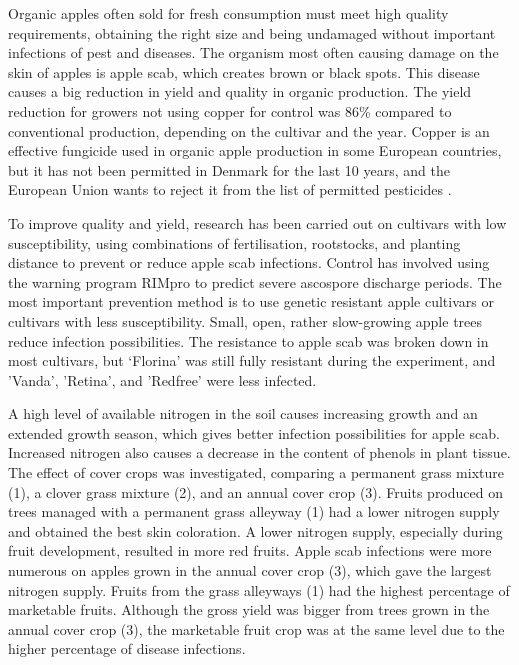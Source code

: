 Organic apples often sold for fresh consumption must meet high quality requirements, obtaining the right size and being undamaged without important infections of pest and diseases. The organism most often causing damage on the skin of apples is apple scab, which creates brown or black spots. This disease causes a big reduction in yield and quality in organic production. The yield reduction for growers not using copper for control was 86\% compared to conventional production, depending on the cultivar and the year. Copper is an effective fungicide used in organic apple production in some European countries, but it has not been permitted in Denmark for the last 10 years, and the European Union wants to reject it from the list of permitted pesticides \cite*{rm_10.1_L17-18_sustainable_production_organic_apple_production}.

\vspace{0.5em}
To improve quality and yield, research has been carried out on cultivars with low susceptibility, using combinations of fertilisation, rootstocks, and planting distance to prevent or reduce apple scab infections. Control has involved using the warning program RIMpro to predict severe ascospore discharge periods. The most important prevention method is to use genetic resistant apple cultivars or cultivars with less susceptibility. Small, open, rather slow-growing apple trees reduce infection possibilities. The resistance to apple scab was broken down in most cultivars, but ‘Florina’ was still fully resistant during the experiment, and 'Vanda', 'Retina', and 'Redfree' were less infected.

\vspace{0.5em}
A high level of available nitrogen in the soil causes increasing growth and an extended growth season, which gives better infection possibilities for apple scab. Increased nitrogen also causes a decrease in the content of phenols in plant tissue. The effect of cover crops was investigated, comparing a permanent grass mixture (1), a clover grass mixture (2), and an annual cover crop (3). Fruits produced on trees managed with a permanent grass alleyway (1) had a lower nitrogen supply and obtained the best skin coloration. A lower nitrogen supply, especially during fruit development, resulted in more red fruits. Apple scab infections were more numerous on apples grown in the annual cover crop (3), which gave the largest nitrogen supply. Fruits from the grass alleyways (1) had the highest percentage of marketable fruits. Although the gross yield was bigger from trees grown in the annual cover crop (3), the marketable fruit crop was at the same level due to the higher percentage of disease infections.

